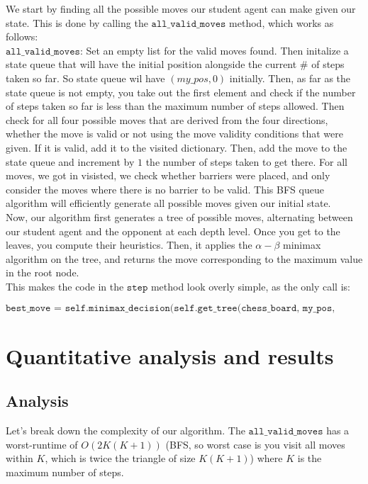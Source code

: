\documentclass[11pt]{article}
\begin{document}
We start by finding all the possible moves our student agent can make given our state. This is done by calling the $\texttt{all\_valid\_moves}$ method, which works as follows:
\\

$\texttt{all\_valid\_moves}$: Set an empty list for the valid moves found. Then initalize a state queue that will have the initial position alongside the current \# of steps taken so far. So state queue
wil have $(my\_pos, 0)$ initially. Then, as far as the state queue is not empty, you take out the first element and check if the number of steps taken so far is less than the maximum number of steps allowed. Then check for all four possible moves that are derived from the four directions,
whether the move is valid or not using the move validity conditions that were given. If it is valid, add it to the visited dictionary. Then, add the move to the state queue and increment by $1$ the number of steps taken to get there. For all moves, we got in visisted, we check whether barriers were placed, and only consider the moves where there is no barrier to be valid.
This BFS queue algorithm will efficiently generate all possible moves given our initial state.
\\

Now, our algorithm first generates a tree of possible moves, alternating between our student agent and the opponent at each depth level. Once you get to the leaves, you compute their heuristics.  Then, it applies the $\alpha - \beta$ minimax
 algorithm on the tree, and returns the move corresponding to the maximum value in the root node.
\\

This makes the code in the $\texttt{step}$ method look overly simple, as the only call is:

\begin{equation*}
    \texttt{best\_move = self.minimax\_decision(self.get\_tree(chess\_board, my\_pos, adv\_pos, max\_step))}
\end{equation*}


\section{Quantitative analysis and results}

\subsection{Analysis}

Let's break down the complexity of our algorithm. The $\texttt{all\_valid\_moves}$ has a worst-runtime of $O(2K(K+1))$ (BFS, so worst case is you visit all moves within $K$, which is twice the triangle of size $K(K+1)$) where $K$ is the maximum number of steps.
\\
\end{document}
